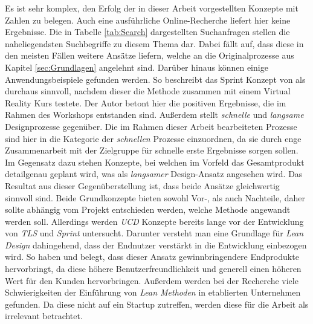 Es ist sehr komplex, den Erfolg der in dieser Arbeit vorgestellten Konzepte mit Zahlen zu belegen. Auch eine ausführliche Online-Recherche liefert hier keine Ergebnisse. Die in Tabelle \ref{tab:Search} dargestellten Suchanfragen stellen die naheliegendsten Suchbegriffe zu diesem Thema dar. Dabei fällt auf, dass diese in den meisten Fällen weitere Ansätze liefern, welche an die Originalprozesse aus Kapitel \ref{sec:Grundlagen} angelehnt sind. Darüber hinaus können einige Anwendungsbeispiele gefunden werden. So beschreibt  das Sprint Konzept von  als durchaus sinnvoll, nachdem dieser die Methode zusammen mit einem Virtual Reality Kurs testete. Der Autor betont hier die positiven Ergebnisse, die im Rahmen des Workshops entstanden sind. Außerdem stellt  \textit{schnelle} und \textit{langsame} Designprozesse gegenüber. Die im Rahmen dieser Arbeit bearbeiteten Prozesse sind hier in die Kategorie der \textit{schnellen} Prozesse einzuordnen, da sie durch enge Zusammenarbeit mit der Zielgruppe für schnelle erste Ergebnisse sorgen sollen. Im Gegensatz dazu stehen Konzepte, bei welchen im Vorfeld das Gesamtprodukt detailgenau geplant wird, was als \textit{langsamer} Design-Ansatz angesehen wird. Das Resultat aus dieser Gegenüberstellung ist, dass beide Ansätze gleichwertig sinnvoll sind. Beide Grundkonzepte bieten sowohl Vor-, als auch Nachteile, daher sollte abhängig vom Projekt entschieden werden, welche Methode angewandt werden soll. Allerdings werden \textit{\ac{UCD}} Konzepte bereits lange vor der Entwicklung von \textit{\ac{TLS}} und \textit{Sprint} untersucht. Darunter versteht man eine Grundlage für \textit{Lean Design} dahingehend, dass der Endnutzer verstärkt in die Entwicklung einbezogen wird. So haben  und  belegt, dass dieser Ansatz gewinnbringendere Endprodukte hervorbringt, da diese höhere Benutzerfreundlichkeit und generell einen höheren Wert für den Kunden hervorbringen. Außerdem werden bei der Recherche viele Schwierigkeiten der Einführung von \textit{Lean Methoden} in etablierten Unternehmen gefunden. Da diese nicht auf ein Startup zutreffen, werden diese für die Arbeit als irrelevant betrachtet.

